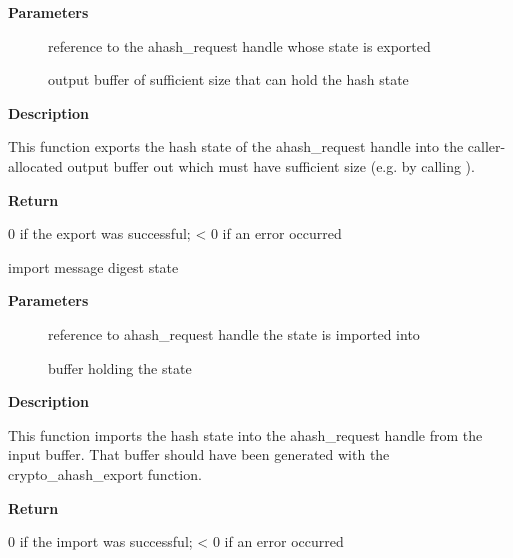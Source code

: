 \documentclass[a4paper,8pt,english]{sphinxmanual}
\begin{document}
\textbf{Parameters}
\begin{description}
\item[{}] \leavevmode
reference to the ahash\_request handle whose state is exported

\item[{}] \leavevmode
output buffer of sufficient size that can hold the hash state

\end{description}

\textbf{Description}

This function exports the hash state of the ahash\_request handle into the
caller-allocated output buffer out which must have sufficient size (e.g. by
calling {\hyperref[crypto/api\string-digest:c.crypto_ahash_statesize]{}}).

\textbf{Return}

0 if the export was successful; \textless{} 0 if an error occurred

\begin{fulllineitems}
\label{crypto/api-digest:c.crypto_ahash_import}
import message digest state

\end{fulllineitems}


\textbf{Parameters}
\begin{description}
\item[{}] \leavevmode
reference to ahash\_request handle the state is imported into

\item[{}] \leavevmode
buffer holding the state

\end{description}

\textbf{Description}

This function imports the hash state into the ahash\_request handle from the
input buffer. That buffer should have been generated with the
crypto\_ahash\_export function.

\textbf{Return}

0 if the import was successful; \textless{} 0 if an error occurred
\end{document}
